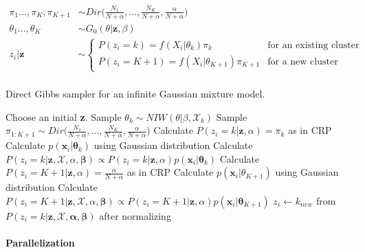 \documentclass[a4paper]{article}
\begin{document}
\begin{align*}
\pi_1...,\pi_K, \pi_{K+1} &\sim Dir\big(\frac{N_1}{N+\alpha},...,\frac{N_K}{N+\alpha}, \frac{\alpha}{N+\alpha}\big) \\
\theta_1...,\theta_K&\sim G_0(\theta|\boldsymbol z, \beta) \\
z_i|\boldsymbol z &\sim \begin{cases}
P(z_i=k)= f(X_i|\theta_{k})\pi_k & \text{for an existing cluster} \\
P(z_i=K+1)= f(X_i|\theta_{K+1})\pi_{K+1}& \text{for a new cluster}
\end{cases}\\
\end{align*}

\begin{algorithm}[H]
  \caption{Direct Gibbs sampler for an infinite Gaussian mixture model.}\label{directgibbs}
  \begin{algorithmic}[1]
    
  \State Choose an initial \textbf{z}.
   
     
            \State Sample $\theta_k \sim NIW(\theta|\beta,\mathcal{X}_{k})$ 
    \EndFor
    \State Sample $\pi_{1:K+1} \sim Dir\big(\frac{N_1}{N+\alpha},...,\frac{N_K}{N+\alpha}, \frac{\alpha}{N+\alpha}\big)$
         
            \State Calculate $P(z_i = k | \mathbf{z},\alpha) = \pi_k$ as in CRP
            \State Calculate $p(\mathbf{x}_i|\mathbf{\theta}_k)$ using Gaussian distribution
            \State Calculate $P(z_i = k | \mathbf{z},\mathcal{X},\alpha,\mathbf{\beta}) \propto P(z_i = k | \mathbf{z},\alpha)p(\mathbf{x}_i|\mathbf{\theta}_k)$
        \EndFor
        \State Calculate $P(z_i = K+1 | \mathbf{z},\alpha) = \frac{\alpha}{N+\alpha}$ as in CRP 
        \State Calculate $p(\mathbf{x}_i|\theta_{K+1})$ using Gaussian distribution
        \State Calculate $P(z_i = K+1 | \mathbf{z},\mathcal{X},\alpha, \mathbf{\beta}) \propto P(z_i = K+1 | \mathbf{z},\alpha)p(\mathbf{x}_i|\mathbf{\theta}_{K+1})$
        \State $z_i \gets k_{new}$ from $P(z_i = k | \mathbf{z},\mathcal{X},\mathbf{\alpha},\mathbf{\beta})$ after normalizing
    \EndFor
  \EndFor
  \end{algorithmic}
\end{algorithm}

\paragraph{Parallelization}
\end{document}
